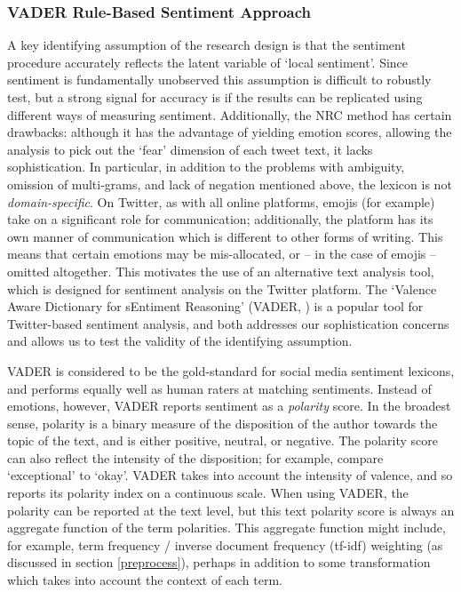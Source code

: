 \documentclass{article}
\begin{document}
\subsubsection{VADER Rule-Based Sentiment Approach}\label{vader}
A key identifying assumption of the research design is that the sentiment procedure accurately reflects the latent variable of `local sentiment'. Since sentiment is fundamentally unobserved this assumption is difficult to robustly test, but a strong signal for accuracy is if the results can be replicated using different ways of measuring sentiment. Additionally, the NRC method has certain drawbacks: although it has the advantage of yielding emotion scores, allowing the analysis to pick out the `fear' dimension of each tweet text, it lacks sophistication. In particular, in addition to the problems with ambiguity, omission of multi-grams, and lack of negation mentioned above, the lexicon is not \textit{domain-specific}. On Twitter, as with all online platforms, emojis (for example) take on a significant role for communication; additionally, the platform has its own manner of communication which is different to other forms of writing. This means that certain emotions may be mis-allocated, or -- in the case of emojis -- omitted altogether. This motivates the use of an alternative text analysis tool, which is designed for sentiment analysis on the Twitter platform. The `Valence Aware Dictionary for sEntiment Reasoning' (VADER, \textcite{huttoVaderParsimoniousRulebased2014}) is a popular tool for Twitter-based sentiment analysis, and both addresses our sophistication concerns and allows us to test the validity of the identifying assumption.

VADER is considered to be the gold-standard for social media sentiment lexicons, and performs equally well as human raters at matching sentiments. Instead of emotions, however, VADER reports sentiment as a \textit{polarity} score. In the broadest sense, polarity is a binary measure of the disposition of the author towards the topic of the text, and is either positive, neutral, or negative. The polarity score can also reflect the intensity of the disposition; for example, compare `exceptional' to `okay'. VADER takes into account the intensity of valence, and so reports its polarity index on a continuous scale. When using VADER, the polarity can be reported at the text level, but this text polarity score is always an aggregate function of the term polarities. This aggregate function might include, for example, term frequency / inverse document frequency (tf-idf) weighting (as discussed in section \ref{preprocess}), perhaps in addition to some transformation which takes into account the context of each term.
\end{document}
